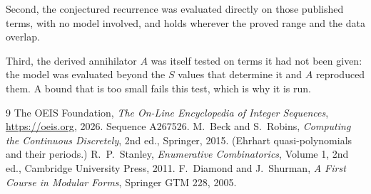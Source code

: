 \documentclass[11pt,a4paper]{article}
\theoremstyle{plain}
\theoremstyle{definition}
\begin{document}
Second, the conjectured recurrence was evaluated directly on those published terms, with no
model involved, and holds wherever the proved range and the data overlap.

Third, the derived annihilator $A$ was itself tested on terms it had not been given: the model
was evaluated beyond the $S$ values that determine it and $A$ reproduced them. A bound that is
too small fails this test, which is why it is run.

\begin{thebibliography}{9}
 The OEIS Foundation, \emph{The On-Line Encyclopedia of Integer
Sequences}, \url{https://oeis.org}, 2026. Sequence A267526.
 M.~Beck and S.~Robins, \emph{Computing the Continuous Discretely},
2nd ed., Springer, 2015. (Ehrhart quasi-polynomials and their periods.)
 R.~P.~Stanley, \emph{Enumerative Combinatorics}, Volume 1, 2nd ed.,
Cambridge University Press, 2011.
 F.~Diamond and J.~Shurman, \emph{A First Course in Modular Forms},
Springer GTM 228, 2005.
\end{thebibliography}
\end{document}
